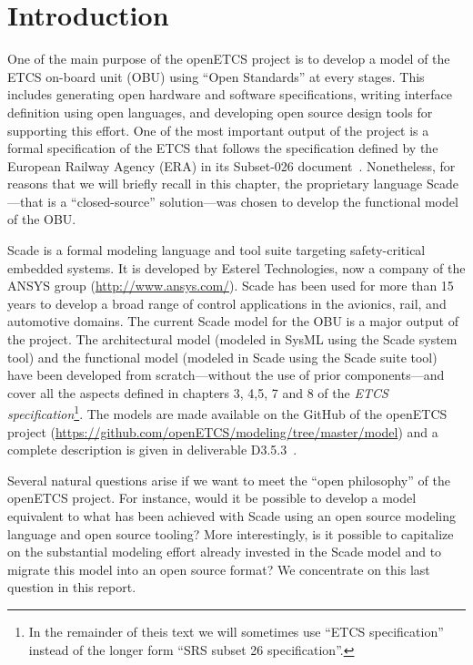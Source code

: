 \documentclass{template/openetcs_report}
\begin{document}

\mainmatter


\chapter{Introduction}
\label{cha:introduction}

One of the main purpose of the openETCS project is to develop a model
of the ETCS on-board unit (OBU) using ``Open Standards'' at every
stages. This includes generating open hardware and software
specifications, writing interface definition using open languages, and
developing open source design tools for supporting this effort. One of
the most important output of the project is a formal specification of
the ETCS that follows the specification defined by the European
Railway Agency (ERA) in its Subset-026
document~\cite{subset-026}. Nonetheless, for reasons that we will
briefly recall in this chapter, the proprietary language Scade---that
is a ``closed-source'' solution---was chosen to develop the functional
model of the OBU.

Scade is a formal modeling language and tool suite targeting
safety-critical embedded systems. It is developed by Esterel
Technologies, now a company of the ANSYS group
(\url{http://www.ansys.com/}). Scade has been used for more than 15
years to develop a broad range of control applications in the
avionics, rail, and automotive domains. The current Scade model for
the OBU is a major output of the project. The architectural model
(modeled in SysML using the Scade system tool) and the functional
model (modeled in Scade using the Scade suite tool) have been
developed from scratch---without the use of prior components---and
cover all the aspects defined in chapters 3, 4,5, 7 and 8 of the
\emph{ETCS specification}\footnote{In the remainder of theis text we
  will sometimes use ``ETCS specification'' instead of the longer form
  ``SRS subset 26 specification''.}. The models are made available on
the GitHub of the openETCS project
(\url{https://github.com/openETCS/modeling/tree/master/model}) and a
complete description is given in deliverable D3.5.3~\cite{d353}.

Several natural questions arise if we want to meet the ``open
philosophy'' of the openETCS project. For instance, would it be
possible to develop a model equivalent to what has been achieved with
Scade using an open source modeling language and open source tooling?
More interestingly, is it possible to capitalize on the substantial
modeling effort already invested in the Scade model and to migrate
this model into an open source format?  We concentrate on this last
question in this report.
\end{document}
